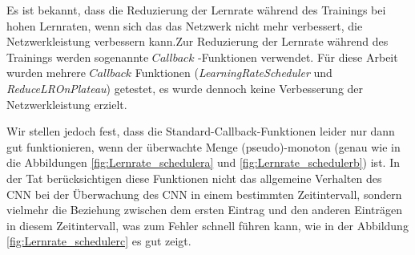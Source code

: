 \documentclass[12pt,a4paper]{scrartcl}
\numberwithin{equation}{section}
\begin{document}
 Es ist bekannt, dass die Reduzierung der Lernrate während des Trainings bei hohen Lernraten, wenn sich das das Netzwerk nicht mehr verbessert, die Netzwerkleistung verbessern kann.Zur Reduzierung der Lernrate während des Trainings werden sogenannte \glqq $  Callback$ \grqq-Funktionen verwendet. Für diese Arbeit wurden mehrere $  Callback$ Funktionen (\textit{LearningRateScheduler} und \textit{ReduceLROnPlateau}) getestet, es wurde dennoch keine Verbesserung der Netzwerkleistung erzielt.
 
 Wir stellen jedoch fest, dass die Standard-Callback-Funktionen leider nur dann gut funktionieren, wenn der überwachte Menge (pseudo)-monoton (genau wie in die Abbildungen \ref{fig:Lernrate_schedulera} und \ref{fig:Lernrate_schedulerb}) ist. In der Tat berücksichtigen diese Funktionen nicht das allgemeine Verhalten des CNN bei der Überwachung des CNN in einem bestimmten Zeitintervall, sondern vielmehr die Beziehung zwischen dem ersten Eintrag und den anderen Einträgen in diesem Zeitintervall, was zum Fehler schnell führen kann, wie in der Abbildung \ref{fig:Lernrate_schedulerc} es gut zeigt.
 
\end{document}
